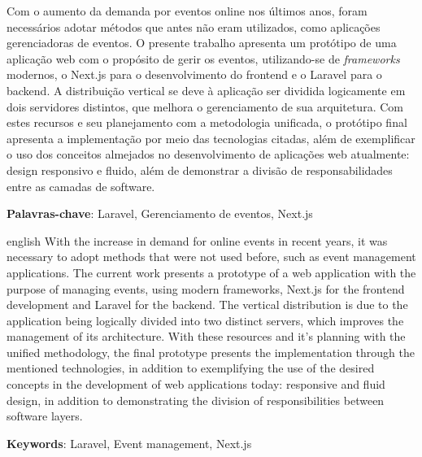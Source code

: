 \documentclass[
	12pt,			%
	openany,		%
	oneside,		%
	a4paper,		%
	english,		%
	brazil			%
	]{abntex2}
\begin{document}
\setlength{\absparsep}{18pt} %

\begin{resumo}
Com o aumento da demanda por eventos online nos últimos anos, foram necessários adotar métodos que antes não eram utilizados, como aplicações gerenciadoras de eventos. O presente trabalho apresenta um protótipo de uma aplicação web com o propósito de gerir os eventos, utilizando-se de \textit{frameworks} modernos, o Next.js para o desenvolvimento do frontend e o Laravel para o backend. A distribuição vertical se deve à aplicação ser dividida logicamente em dois servidores distintos, que melhora o gerenciamento de sua arquitetura. Com estes recursos e seu planejamento com a metodologia unificada, o protótipo final apresenta a implementação por meio das tecnologias citadas, além de exemplificar o uso dos conceitos almejados no desenvolvimento de aplicações web atualmente: design responsivo e fluido, além de demonstrar a divisão de responsabilidades entre as camadas de software.

\textbf{Palavras-chave}: Laravel, Gerenciamento de eventos, Next.js
\end{resumo}

\begin{resumo}[Abstract]
\begin{otherlanguage*}{english}
With the increase in demand for online events in recent years, it was necessary to adopt methods that were not used before, such as event management applications. The current work presents a prototype of a web application with the purpose of managing events, using modern frameworks, Next.js for the frontend development and Laravel for the backend. The vertical distribution is due to the application being logically divided into two distinct servers, which improves the management of its architecture. With these resources and it's planning with the unified methodology, the final prototype presents the implementation through the mentioned technologies, in addition to exemplifying the use of the desired concepts in the development of web applications today: responsive and fluid design, in addition to demonstrating the division of responsibilities between software layers.

\textbf{Keywords}: Laravel, Event management, Next.js
\end{otherlanguage*}
\end{resumo}
 
\end{document}
